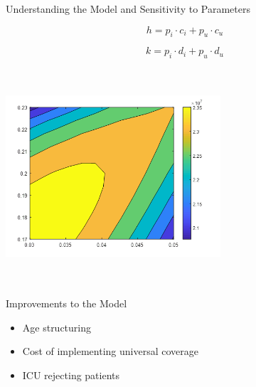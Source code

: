 \documentclass[notes]{beamer}
\begin{document}
\begin{frame}{Understanding the Model and Sensitivity to Parameters}

$$h = p_i\cdot c_i + p_u \cdot c_u$$

$$k = p_i\cdot d_i + p_u \cdot d_u$$



\includegraphics[width=8cm,height=8cm,keepaspectratio]{image11.png}


\end{frame}




\begin{frame}{Improvements to the Model}

\begin{itemize}
 \item<1-> Age structuring
 \item<2-> Cost of implementing universal coverage
 \item<3-> ICU rejecting patients
 
\end{itemize}


\end{frame}
\end{document}
